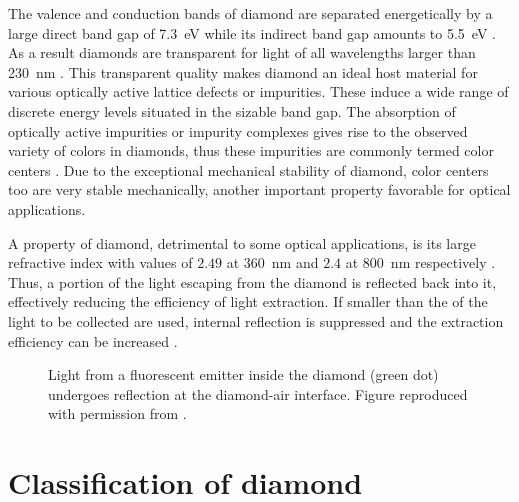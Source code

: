   The valence and conduction bands of diamond are separated energetically by a large direct band gap of \SI{7.3}{\eV} while its indirect band gap amounts to \SI{5.5}{\eV} \cite{Clark1964, Saslow1966}. As a result diamonds are transparent for light of all wavelengths larger than \SI{230}{\nm} \cite{Mildren2008}. This transparent quality makes diamond an ideal host material for various optically active lattice defects or impurities. These induce a wide range of discrete energy levels situated in the sizable band gap. The absorption of optically active impurities or impurity complexes gives rise to the observed variety of colors in diamonds, thus these impurities are commonly termed color centers \cite{neu2012}. Due to the exceptional mechanical stability of diamond, color centers too are very stable mechanically, another important property favorable for optical applications.

  A property of diamond, detrimental to some optical applications, is its large refractive index with values of $2.49$ at \SI{360}{\nm} and $2.4$ at \SI{800}{\nm} respectively \cite{Zaitsev2001}. Thus, a portion of the light escaping from the diamond is reflected back into it, effectively reducing the efficiency of light extraction. If \nds smaller than the \wl of the light to be collected are used, internal reflection is suppressed and the extraction efficiency can be increased \cite{Beveratos2001}.

  \begin{figure}[htbp]
		\centering
		\caption[Reduced light extraction efficiency of diamond due to refraction]{Light from a fluorescent emitter inside the diamond (green dot) undergoes reflection at the diamond-air interface. Figure reproduced with permission from \cite{neu2012}.}
		\label{fig::diamond_refraction}
	\end{figure}

\section{Classification of diamond}

